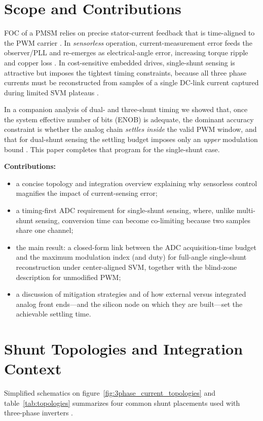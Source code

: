 \documentclass[conference]{IEEEtran}
\begin{document}
\section{Scope and Contributions}
FOC of a PMSM relies on precise stator-current feedback that is time-aligned to the PWM carrier \cite{Krause2013,Krishnan2010}. In \emph{sensorless} operation, current-measurement error feeds the observer/PLL and re-emerges as electrical-angle error, increasing torque ripple and copper loss \cite{Vas1998,Holtz2002}. In cost-sensitive embedded drives, single-shunt sensing is attractive but imposes the tightest timing constraints, because all three phase currents must be reconstructed from samples of a single DC-link current captured during limited SVM plateaus \cite{Blaabjerg1997,Bose2002}.



In a companion analysis of dual- and three-shunt timing we showed that, once the system effective number of bits (ENOB) is adequate, the dominant accuracy constraint is whether the analog chain \emph{settles inside} the valid PWM window, and that for dual-shunt sensing the settling budget imposes only an \emph{upper} modulation bound \cite{wendler_enhancing_2025,wendler_analysis_2025}. This paper completes that program for the single-shunt case.

\textbf{Contributions:}
\begin{itemize}
\item a concise topology and integration overview explaining why sensorless control magnifies the impact of current-sensing error;
\item a timing-first ADC requirement for single-shunt sensing, where, unlike multi-shunt sensing, conversion time can become co-limiting because two samples share one channel;
\item the main result: a closed-form link between the ADC acquisition-time budget and the maximum modulation index (and duty) for full-angle single-shunt reconstruction under center-aligned SVM, together with the blind-zone description for unmodified PWM;
\item a discussion of mitigation strategies and of how external versus integrated analog front ends---and the silicon node on which they are built---set the achievable settling time.
\end{itemize}

\section{Shunt Topologies and Integration Context}
Simplified schematics on figure~\ref{fig:3phase_current_topologies} and table~\ref{tab:topologies} summarizes four common shunt placements used with three-phase inverters \cite{Krause2013,Bose2002,Kester2005}.
\end{document}
